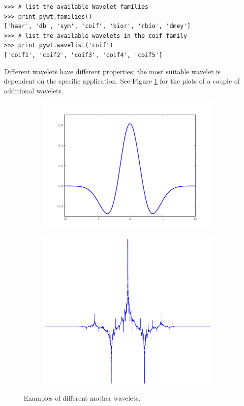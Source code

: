 \begin{lstlisting}
>>> # list the available Wavelet families
>>> print pywt.families()
['haar', 'db', 'sym', 'coif', 'bior', 'rbio', 'dmey']
>>> # list the available wavelets in the coif family
>>> print pywt.wavelist('coif')
['coif1', 'coif2', 'coif3', 'coif4', 'coif5']

\end{lstlisting}
Different wavelets have different properties; the most suitable wavelet is dependent on the specific application.
See Figure \ref{fig:more_wavelets} for the plots of a couple of additional wavelets.
\begin{figure}[H]
\begin{subfigure}[b]{0.45\textwidth}
    \includegraphics[width=\textwidth]{figures/mexicanHat}
\end{subfigure}
\begin{subfigure}[b]{0.45\textwidth}
    \includegraphics[width=\textwidth]{figures/db5_3}
\end{subfigure}
\caption{Examples of different mother wavelets.}
\label{fig:more_wavelets}
\end{figure}

